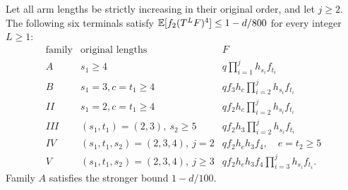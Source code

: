 \begin{lemma}\label{lem:R34:unit-multipair}
Let all arm lengths be strictly increasing in their original order,
and let \(j\ge2\). The following six terminals satisfy
\(\mathbb E[f_2(T^LF)^4]\le1-d/800\) for every integer \(L\ge1\):
\[
\begin{array}{c|l|l}
\text{family}&\text{original lengths}&F\\\hline
A&s_1\ge4&q\prod_{i=1}^j h_{s_i}f_{t_i}\\
B&s_1=3, c=t_1\ge4&qf_3h_c\prod_{i=2}^j h_{s_i}f_{t_i}\\
II&s_1=2, c=t_1\ge4&qf_2h_c\prod_{i=2}^j h_{s_i}f_{t_i}\\
III&(s_1,t_1)=(2,3),\ s_2\ge5&qf_2h_3\prod_{i=2}^j h_{s_i}f_{t_i}\\
IV&(s_1,t_1,s_2)=(2,3,4),\ j=2&qf_2h_eh_3f_4,\quad e=t_2\ge5\\
V&(s_1,t_1,s_2)=(2,3,4),\ j\ge3&qf_2h_eh_3f_4\prod_{i=3}^j h_{s_i}f_{t_i}.
\end{array}
\]
Family \(A\) satisfies the stronger bound \(1-d/100\).
\end{lemma}
